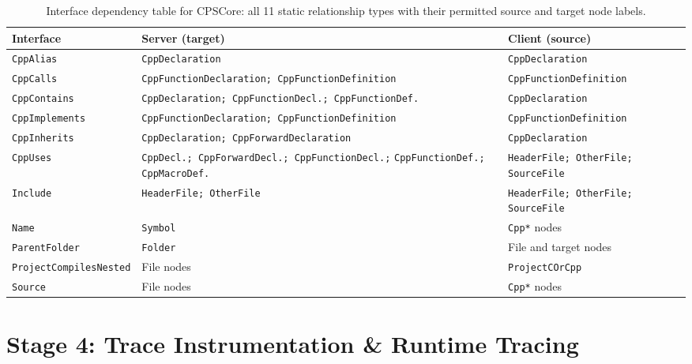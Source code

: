 \begin{table}[htb]
\centering
\caption{Interface dependency table for CPSCore: all 11 static relationship
  types with their permitted source and target node labels.}
\label{tab:idt}
\small
\begin{tabularx}{\textwidth}{@{} >{\ttfamily}p{} p{}>{\raggedright\arraybackslash}X @{}}
\toprule
\textbf{Interface} & \textbf{Server (target)} & \textbf{Client (source)} \\
\midrule
\texttt{CppAlias}       & \texttt{CppDeclaration} & \texttt{CppDeclaration} \\
\texttt{CppCalls}       & \texttt{CppFunctionDeclaration; CppFunctionDefinition}
                        & \texttt{CppFunctionDefinition} \\
\texttt{CppContains}    & \texttt{CppDeclaration; CppFunctionDecl.; CppFunctionDef.}
                        & \texttt{CppDeclaration} \\
\texttt{CppImplements}  & \texttt{CppFunctionDeclaration; CppFunctionDefinition}
                        & \texttt{CppFunctionDefinition} \\
\texttt{CppInherits}    & \texttt{CppDeclaration; CppForwardDeclaration}
                        & \texttt{CppDeclaration} \\
\texttt{CppUses}        & \texttt{CppDecl.; CppForwardDecl.; CppFunctionDecl.;} \newline
                          \texttt{CppFunctionDef.; CppMacroDef.}
                        & \texttt{HeaderFile; OtherFile; SourceFile} \\
\texttt{Include}        & \texttt{HeaderFile; OtherFile}
                        & \texttt{HeaderFile; OtherFile; SourceFile} \\
\texttt{Name}           & \texttt{Symbol}
                        & \texttt{Cpp*} nodes \\
\texttt{ParentFolder}   & \texttt{Folder}
                        & File and target nodes \\
\texttt{ProjectCompilesNested} & File nodes & \texttt{ProjectCOrCpp} \\
\texttt{Source}         & File nodes & \texttt{Cpp*} nodes \\
\bottomrule
\end{tabularx}
\end{table}

\section{Stage 4: Trace Instrumentation \& Runtime Tracing}\label{sec:trace-impl}

